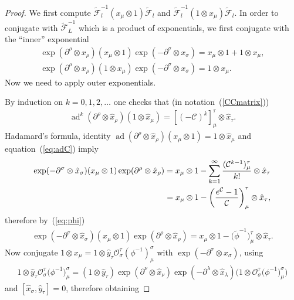 \documentclass[pdftex]{sigma}
\def\CC{\mathcal{C}}
\def\OO{\mathcal{O}}
\def\hx{\hat{x}}
\def\hy{\hat{y}}
\def\ad{\operatorname{ad}}
\numberwithin{equation}{section}
\begin{document}
\begin{proof} We first compute $\tilde{\mathcal{F}}^{-1}_l(x_\mu\otimes 1)\tilde{\mathcal{F}}_l$ and $\tilde{\mathcal{F}}^{-1}_l(1\otimes x_\mu)\tilde{\mathcal{F}}_l$. In order to conjugate with $\tilde{\mathcal{F}}^{-1}_L$ which is a product of exponentials, we first conjugate with the ``inner'' exponential
\begin{gather}\label{eq:ex1e}
\exp(\partial^\rho\otimes x_\rho)(x_\mu\otimes 1)\exp(-\partial^\sigma\otimes x_\sigma) = x_\mu\otimes 1 + 1\otimes x_\mu,\\
\label{eq:e1xe}
\exp(\partial^\rho\otimes x_\rho)(1\otimes x_\mu)\exp(-\partial^\sigma\otimes x_\sigma) = 1\otimes x_\mu.
\end{gather}
Now we need to apply outer exponentials.

By induction on $k = 0,1,2,\ldots$ one checks that
(in notation~(\ref{CCmatrix}))
\begin{gather}\label{eq:adC}
\ad^k(\partial^\rho\otimes\hx_\rho) (1\otimes\hx_\mu) = [(-\CC)^k]^\tau_\mu\otimes\hx_\tau.
\end{gather}
Hadamard's formula, identity $\ad(\partial^\rho\otimes\hx_\rho)(x_\mu\otimes 1)=1\otimes\hx_\mu$ and equation~(\ref{eq:adC}) imply
\begin{gather*}
\exp(-\partial^\sigma\otimes\hx_\sigma)(x_\mu\otimes 1)\exp(\partial^\rho\otimes\hat{x}_\rho) = x_\mu\otimes 1 - \sum_{k=1}^\infty \frac{(\CC^{k-1})^\tau_\mu}{k!}\otimes\hx_\tau\\
\hphantom{\exp(-\partial^\sigma\otimes\hx_\sigma)(x_\mu\otimes 1)\exp(\partial^\rho\otimes\hat{x}_\rho) }{}
 = x_\mu\otimes 1 - \left(\frac{e^{\CC}-1}{\CC}\right)^\tau_\mu\otimes\hx_\tau,
\end{gather*}
therefore by~(\ref{eq:phi})
\begin{gather}\label{eq:eFe}
\exp(-\partial^\sigma\otimes\hx_\sigma)(x_\mu\otimes 1)\exp(\partial^\rho\otimes
\hat{x}_\rho) = x_\mu\otimes 1 - \big(\tilde\phi^{-1}\big)^\tau_\mu\otimes\hat{x}_\tau.
\end{gather}
Now conjugate $1\otimes x_\mu = 1\otimes\hy_\tau\OO^\tau_\sigma(\phi^{-1})^\sigma_\mu$ with $\exp(-\partial^\sigma\otimes\hx_\sigma)$, using
\begin{gather*}1\otimes\hy_\tau\OO^\tau_\sigma\big(\phi^{-1}\big)^\sigma_\mu = (1\otimes\hy_\tau)\exp(\partial^\nu\otimes\hx_\nu)\exp(-\partial^\lambda\otimes\hx_\lambda)\big(1\otimes\OO^\tau_\sigma \big(\phi^{-1}\big)^\sigma_\mu\big)\end{gather*}
and $[\hx_\sigma,\hy_\tau] = 0$, therefore obtaining

\end{proof}
\end{document}
